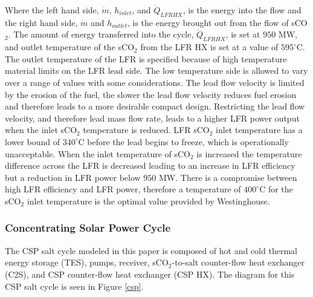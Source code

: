 \begin{paracol}{2}
Where the left hand side, $\dot{m}$, $h_{inlet}$, and $\dot{Q}_{LFRHX}$, is the energy into the flow and the right hand side, $\dot{m}$ and $h_{outlet}$, is the energy brought out from the flow of sCO$_2$. The amount of energy transferred into the cycle, $\dot{Q}_{LFRHX}$, is set at $950$ MW, and outlet temperature of the sCO$_2$ from the LFR HX is set at a value of $595^{\circ}$C. The outlet temperature of the LFR is specified because of high temperature material limits on the LFR lead side. The low temperature side is allowed to vary over a range of values with some considerations. The lead flow velocity is limited by the erosion of the fuel, the slower the lead flow velocity reduces fuel erosion and therefore leads to a more desirable compact design. Restricting the lead flow velocity, and therefore lead mass flow rate, leads to a higher LFR power output when the inlet sCO$_2$ temperature is reduced. LFR sCO$_2$ inlet temperature has a lower bound of $340^{\circ}$C before the lead begins to freeze, which is operationally unacceptable. When the inlet temperature of sCO$_2$ is increased the temperature difference across the LFR is decreased leading to an increase in LFR efficiency but a reduction in LFR power below $950$ MW. There is a compromise between high LFR efficiency and LFR power, therefore a temperature of $400^{\circ}$C for the sCO$_2$ inlet temperature is the optimal value provided by Westinghouse.






\subsubsection{Concentrating Solar Power Cycle}

The CSP salt cycle modeled in this paper is composed of hot and cold thermal energy storage (TES), pumps, receiver, sCO$_2$-to-salt counter-flow heat exchanger (C2S), and CSP counter-flow heat exchanger (CSP HX). The diagram for this CSP salt cycle is seen in Figure \ref{csp}. 





\end{paracol}
